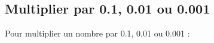 \begin{myexs}
	\begin{multicols}{2}
		\begin{itemize}
			\iftoggle{eleve}{%
				\item $\num{25.26} \times 10 = $ 
				\item $\num{25.26} \times 100 = $
				\item $\num{285} \times 10 = $ 
				\item $\num{285} \times 1000 = $ 
			}{%
		
				\item $\num{25.26} \times 10 = \num{252.6}$ 
				\item $\num{25.26} \times 100 = \num{2526.0} = \num{2526}$
				\item $\num{285} \times 10 = \num{285.0} \times \num{10}= \num{2850}$ 
				\item $\num{285} \times 1000 = \num{285000}$ 
			}
		\end{itemize}	
	\end{multicols}
	
\end{myexs}

\subsection{Multiplier par \num{0.1}, \num{0.01} ou \num{0.001}}

\begin{mymeth}
	Pour multiplier un nombre par \num{0.1}, \num{0.01} ou \num{0.001} :
		\iftoggle{eleve}{%
		\begin{enumerate}[label=\arabic*)]
			\item on repère \hrulefill 
			\item on la décale vers \hrulefill 
			
			\vspace*{0.2cm}
			
			\hrulefill
			\item on rajoute \hrulefill 
			
			\vspace*{0.2cm}
			
			\hrulefill
		\end{enumerate}
	}{%
		\begin{enumerate}[label=\arabic*)]
			\item on repère la virgule;
			\item on la décale vers la gauche d'un rang ($\times \num{0.1}$) , de deux rangs ($\times \num{0.01}$) ou de trois ($\times \num{0.001}$);
			\item on rajoute des zéros si besoin entre le chiffre le plus à gauche et la virgule et avant la virgule.
		\end{enumerate}
	}
\end{mymeth}

